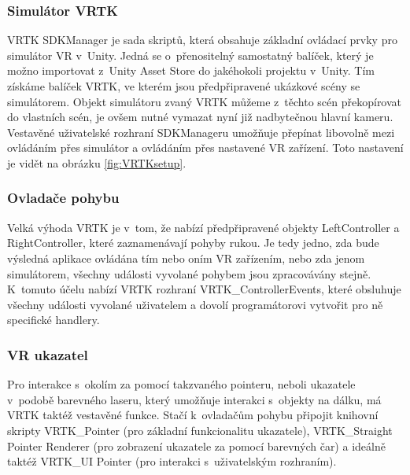 \documentclass[thesis=B,czech]{FITthesis}[2012/06/26]
\begin{document}
\subsubsection{Simulátor VRTK}
VRTK SDKManager je sada skriptů, která obsahuje základní ovládací prvky pro simulátor VR v~Unity. Jedná se o~přenositelný samostatný balíček, který je možno importovat z~Unity Asset Store do jakéhokoli projektu v~Unity. Tím získáme balíček VRTK, ve kterém jsou předpřipravené ukázkové scény se simulátorem. Objekt simulátoru zvaný VRTK můžeme z~těchto scén překopírovat do vlastních scén, je ovšem nutné vymazat nyní již nadbytečnou hlavní kameru. Vestavěné uživatelské rozhraní SDKManageru umožňuje přepínat libovolně mezi ovládáním přes simulátor a ovládáním přes nastavené VR zařízení. \cite{VRTK} Toto nastavení je vidět na obrázku \ref{fig:VRTKsetup}.

\subsubsection{Ovladače pohybu}
Velká výhoda VRTK je v~tom, že nabízí předpřipravené objekty LeftController a RightController, které zaznamenávají pohyby rukou. Je tedy jedno, zda bude výsledná aplikace ovládána tím nebo oním VR zařízením, nebo zda jenom simulátorem, všechny události vyvolané pohybem jsou zpracovávány stejně. K~tomuto účelu nabízí VRTK rozhraní VRTK\_ControllerEvents, které obsluhuje všechny události vyvolané uživatelem a dovolí programátorovi vytvořit pro ně specifické handlery.

\subsubsection{VR ukazatel}
Pro interakce s~okolím za pomocí takzvaného pointeru, neboli ukazatele v~podobě barevného laseru, který umožňuje interakci s~objekty na dálku, má VRTK taktéž vestavěné funkce. Stačí k~ovladačům pohybu připojit knihovní skripty VRTK\_Pointer (pro základní funkcionalitu ukazatele), VRTK\_Straight Pointer Renderer (pro zobrazení ukazatele za pomocí barevných čar) a ideálně taktéž VRTK\_UI Pointer (pro interakci s~uživatelským rozhraním).
\end{document}
